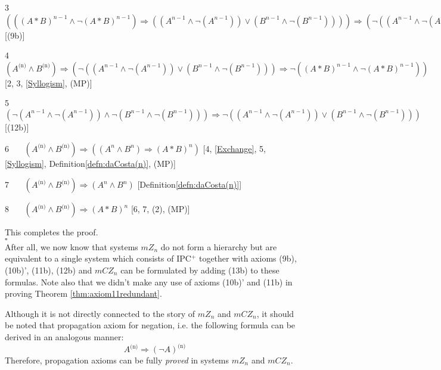 \documentclass{llncs}
\begin{document}
3 \ \ \ $(((A\ast B)^{n-1}\land \neg (A\ast B)^{n-1})\Rightarrow
((A^{n-1} \land \neg (A^{n-1}))\lor (B^{n-1}\land \neg
(B^{n-1}))))\Rightarrow (\neg ((A^{n-1} \land \neg (A^{n-1}))\lor
(B^{n-1}\land \neg (B^{n-1})))\Rightarrow \neg ((A\ast B)^{n-1}\land
\neg (A\ast B)^{n-1}))$ \hfill[(9b)]

4 \ \ \ $(A^{\text{(n)}} \land B^{\text{(n)}}) \Rightarrow (\neg
((A^{n-1} \land \neg (A^{n-1}))\lor (B^{n-1}\land \neg
(B^{n-1})))\Rightarrow \neg ((A\ast B)^{n-1}\land \neg (A\ast
B)^{n-1}))$ \\ \hfill[2, 3, \eqref{Syllogism}, (MP)]

5 \ \ \ $(\neg (A^{n-1} \land \neg (A^{n-1}))\land \neg(B^{n-1}\land
\neg (B^{n-1}))) \Rightarrow \neg ((A^{n-1} \land \neg
(A^{n-1}))\lor (B^{n-1}\land \neg (B^{n-1})))$ \hfill[(12b)]

6 \ \ \ $(A^{\text{(n)}} \land B^{\text{(n)}}) \Rightarrow
((A^n\land B^n)\Rightarrow (A\ast B)^n)$ \hfill[4, \eqref{Exchange},
5, \eqref{Syllogism}, Definition\ref{defn:daCosta(n)}, (MP)]

7 \ \ \ $(A^{\text{(n)}} \land B^{\text{(n)}}) \Rightarrow (A^n\land
B^n)$ \hfill[Definition\ref{defn:daCosta(n)}]

8 \ \ \ $(A^{\text{(n)}} \land B^{\text{(n)}}) \Rightarrow (A \ast
B)^n$ \hfill[6, 7, (2), (MP)]

\noindent This completes the proof.
\\$\square$\\
After all, we now know that systems $mZ_n$ do not form a hierarchy
but are equivalent to a single system which consists of IPC$^+$
together with axioms (9b), (10b)', (11b), (12b) and $mCZ_n$ can be
formulated by adding (13b) to these formulas. Note also that we
didn't make any use of axioms (10b)' and (11b) in proving Theorem
\ref{thm:axiom11redundant}.

Although it is not directly connected to the story of $mZ_n$ and
$mCZ_n$, it should be noted that propagation axiom for negation,
i.e. the following formula can be derived in an analogous manner:
\[ A^{\text{(n)}} \Rightarrow (\neg A)^{\text{(n)}} \]
Therefore, propagation axioms can be fully {\it proved} in systems
$mZ_n$ and $mCZ_n$.
\end{document}
